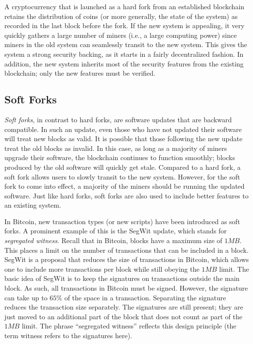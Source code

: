 \documentclass{article}
\begin{document}
A cryptocurrency that is launched as a hard fork from an established blockchain retains the distribution of coins (or more generally, the state of the system) as recorded in the last block before the fork. If the new system is appealing, it very quickly gathers a large number of miners (i.e., a large computing power) since miners in the old system can seamlessly transit to the new system. This gives the system a strong security backing, as it starts in a fairly decentralized fashion. In addition, the new system inherits most of the security features from the existing blockchain; only the new features must be verified.

\subsection*{Soft Forks}
\textit{Soft forks}, in contrast to hard forks, are software updates that are backward compatible. In such an update, even those who have not updated their software will treat new blocks as valid. It is possible that those following the new update treat the old blocks as invalid. In this case, as long as a majority of miners upgrade their software, the blockchain continues to function smoothly; blocks produced by the old software will quickly get stale. Compared to a hard fork, a soft fork allows users to slowly transit to the new system. However, for the soft fork to come into effect, a majority of the miners should be running the updated software. Just like hard forks, soft forks are also used to include better features to an existing system. 

In Bitcoin, new transaction types (or new scripts) have been introduced as soft forks. A prominent example of this is the SegWit update, which stands for \textit{segregated witness}. Recall that in Bitcoin, blocks have a maximum size of $1MB$. This places a limit on the number of transactions that can be included in a block. SegWit is a proposal that reduces the size of transactions in Bitcoin, which allows one to include more transactions per block while still obeying the $1MB$ limit. The basic idea of SegWit is to keep the signatures on transactions outside the main block. As such, all transactions in Bitcoin must be signed. However, the signature can take up to $65\%$ of the space in a transaction. Separating the signature reduces the transaction size separately. The signatures are still present; they are just moved to an additional part of the block that does not count as part of the $1MB$ limit. The phrase ``segregated witness'' reflects this design principle (the term witness refers to the signatures here).
\end{document}

